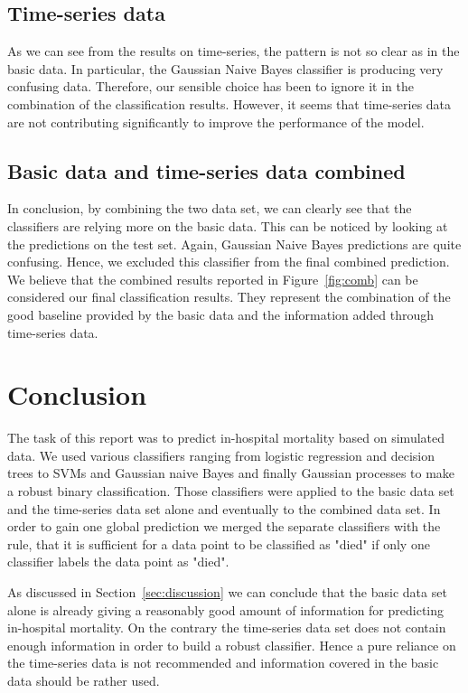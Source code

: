 \documentclass[a4paper,11pt]{article}
\begin{document}
\subsection*{Time-series data}\label{sec:dis_ts_data}
As we can see from the results on time-series, the pattern is not so clear as in the basic data. In particular, the Gaussian Naive Bayes classifier is producing very confusing data. Therefore, our sensible choice has been to ignore it in the combination of the classification results. However, it seems that time-series data are not contributing significantly to improve the performance of the model.


\subsection*{Basic data and time-series data combined}\label{sec:dis_comb_data}
In conclusion, by combining the two data set, we can clearly see that the classifiers are relying more on the basic data. This can be noticed by looking at the predictions on the test set. Again, Gaussian Naive Bayes predictions are quite confusing. Hence, we excluded this classifier from the final combined prediction. We believe that the combined results reported in Figure~\ref{fig:comb} can be considered our final classification results. They represent the combination of the good baseline provided by the basic data and the information added through time-series data.


\section{Conclusion}

The task of this report was to predict in-hospital mortality based on simulated data.
We used various classifiers ranging from logistic regression and decision trees to SVMs and Gaussian naive Bayes and finally Gaussian processes to make a robust binary classification.
Those classifiers were applied to the basic data set and the time-series data set alone and eventually to the combined data set. In order to gain one global prediction we merged the separate classifiers with the rule, that it is sufficient for a data point to be classified as "died" if only one classifier labels the data point as "died".

As discussed in Section~\ref{sec:discussion} we can conclude that the basic data set alone is already giving a reasonably good amount of information for predicting in-hospital mortality. On the contrary the time-series data set does not contain enough information in order to build a robust classifier. Hence a pure reliance on the time-series data is not recommended and information covered in the basic data should be rather used.
\end{document}
